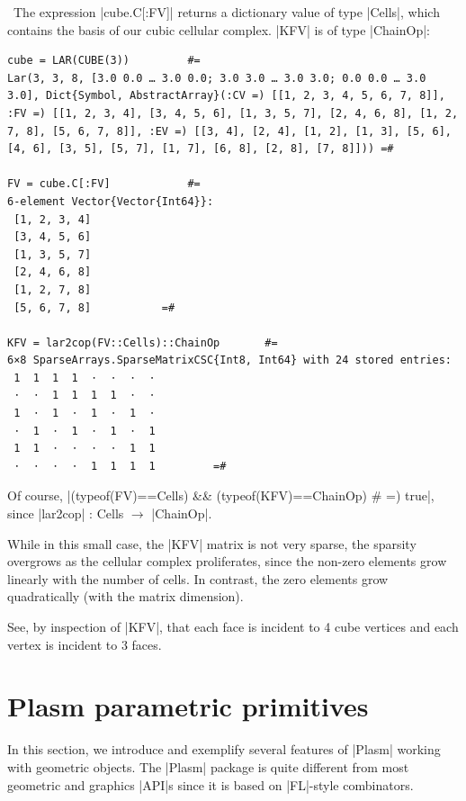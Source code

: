\begin{coding}\
The expression |cube.C[:FV]| returns a dictionary value of type |Cells|, which contains the basis of our cubic cellular complex.  |KFV| is of type |ChainOp|:

\begin{lstlisting}[language=JuliaLocal, style=julia, mathescape = true] 
cube = LAR(CUBE(3))			#=
Lar(3, 3, 8, [3.0 0.0 … 3.0 0.0; 3.0 3.0 … 3.0 3.0; 0.0 0.0 … 3.0 3.0], Dict{Symbol, AbstractArray}(:CV =) [[1, 2, 3, 4, 5, 6, 7, 8]], :FV =) [[1, 2, 3, 4], [3, 4, 5, 6], [1, 3, 5, 7], [2, 4, 6, 8], [1, 2, 7, 8], [5, 6, 7, 8]], :EV =) [[3, 4], [2, 4], [1, 2], [1, 3], [5, 6], [4, 6], [3, 5], [5, 7], [1, 7], [6, 8], [2, 8], [7, 8]])) =#

FV = cube.C[:FV]			#=
6-element Vector{Vector{Int64}}:
 [1, 2, 3, 4]
 [3, 4, 5, 6]
 [1, 3, 5, 7]
 [2, 4, 6, 8]
 [1, 2, 7, 8]
 [5, 6, 7, 8]			=#

KFV = lar2cop(FV::Cells)::ChainOp		#=
6×8 SparseArrays.SparseMatrixCSC{Int8, Int64} with 24 stored entries:
 1  1  1  1  ⋅  ⋅  ⋅  ⋅
 ⋅  ⋅  1  1  1  1  ⋅  ⋅
 1  ⋅  1  ⋅  1  ⋅  1  ⋅
 ⋅  1  ⋅  1  ⋅  1  ⋅  1
 1  1  ⋅  ⋅  ⋅  ⋅  1  1
 ⋅  ⋅  ⋅  ⋅  1  1  1  1			=#
\end{lstlisting}
Of course, |(typeof(FV)==Cells) && (typeof(KFV)==ChainOp) # =) true|, 
since |lar2cop| : Cells $\to$ |ChainOp|.
\end{coding}

\begin{remark}
While in this small case, the |KFV| matrix is not very sparse, the sparsity overgrows as the cellular complex proliferates, since the non-zero elements grow linearly with the number of cells. In contrast, the zero elements grow quadratically (with the matrix dimension).
\end{remark}
\begin{remark}
See, by inspection of |KFV|, that each face is incident to 4 cube vertices and each vertex is incident to 3 faces.
\end{remark}


\section{Plasm parametric primitives}\label{sect:4-2}

In this section, we introduce and exemplify several features of |Plasm| working with geometric objects. The |Plasm| package is quite different from most geometric and graphics |API|s since it is based on |FL|-style combinators.


